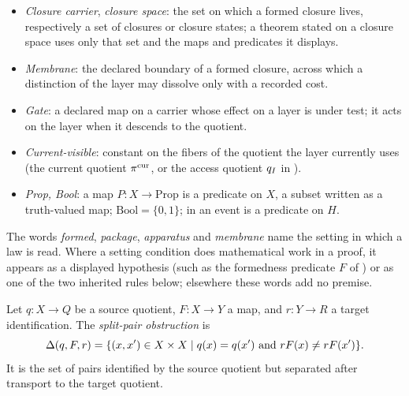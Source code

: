 \begin{itemize}[topsep=2pt,itemsep=1pt]
    removed; an \emph{unpriced} residual is one that no budget accounts
    for.
  \item \emph{Closure carrier}, \emph{closure space}: the set on which a
    formed closure lives, respectively a set of closures or closure
    states; a theorem stated on a closure space uses only that set and
    the maps and predicates it displays.
  \item \emph{Membrane}: the declared boundary of a formed closure,
    across which a distinction of the layer may dissolve only with a
    recorded cost.
  \item \emph{Gate}: a declared map on a carrier whose effect on a layer is
    under test; it acts on the layer when it descends to the quotient.
  \item \emph{Current-visible}: constant on the fibers of the quotient the
    layer currently uses (the current quotient \(\pi^{\mathrm{cur}}\), or the access
    quotient \(q_I\) in ).
  \item \emph{Prop, Bool}: a map \(P:X\to\mathrm{Prop}\) is a predicate on
    \(X\), a subset written as a truth-valued map;
    \(\mathrm{Bool}=\{0,1\}\); in  an event is a predicate on \(H\).
\end{itemize}
The words \emph{formed}, \emph{package}, \emph{apparatus} and
\emph{membrane} name the setting in which a law is read.  Where a
setting condition does mathematical work in a proof, it appears as a
displayed hypothesis (such as the formedness predicate \(F\) of
) or as one of the two inherited rules below; elsewhere these
words add no premise.



\begin{definition}\label{def:split-pair}
Let \(q:X\to Q\) be a source quotient, \(F:X\to Y\) a map, and
\(r:Y\to R\) a target identification.  The \emph{split-pair
obstruction} is
\[
  \Delta(q,F,r)
  =
  \{(x,x')\in X\times X
    \mid q(x)=q(x')\ \text{and}\ rF(x)\ne rF(x')\}.
\]
It is the set of pairs identified by the source quotient but separated
after transport to the target quotient.
\end{definition}

